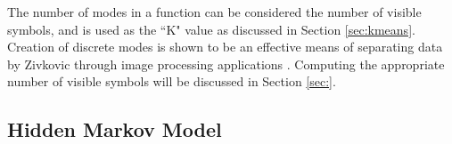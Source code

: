 \documentclass[twocolumn,10pt]{article}
\begin{document}
The number of modes in a function can be considered the number of visible symbols, and is used as the ``K" value as discussed in Section \ref{sec:kmeans}. Creation of discrete modes is shown to be an effective means of separating data by Zivkovic through image processing applications \cite{GMM}.
Computing the appropriate number of visible symbols will be discussed in Section \ref{sec:}.

\subsection{Hidden Markov Model}\label{sec:hmm}





\end{document}
